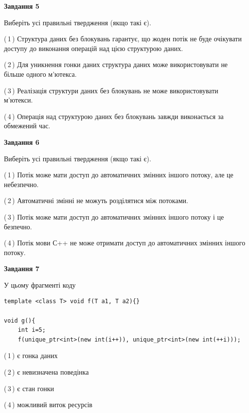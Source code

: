 \documentclass[12pt, ukrainian]{article}
\begin{document}
\begin {large}
{\begin{center}
\textbf{Завдання 5}
\end{center}

Виберіть усі правильні твердження (якщо такі є).\par
\vspace{2mm}

(\,1\,) Структура даних без блокувань гарантує, що жоден потік не буде очікувати доступу до виконання операцій над цією структурою даних.%

(\,2\,) Для уникнення гонки даних структура даних може використовувати не більше одного м’ютекса.%

(\,3\,) Реалізація структури даних без блокувань не може використовувати м’ютекси.%

(\,4\,) Операція над структурою даних без блокувань завжди виконається за обмежений час.%
\newpage


\begin{center}
\textbf{Завдання 6}
\end{center}

Виберіть усі правильні твердження (якщо такі є).\par
\vspace{2mm}

(\,1\,) Потік може мати доступ до автоматичних змінних іншого потоку, але це небезпечно.%

(\,2\,) Автоматичні змінні не можуть розділятися між потоками.%

(\,3\,) Потік може мати доступ до автоматичних змінних іншого потоку і це безпечно.%

(\,4\,) Потік мови С++ не може отримати доступ до автоматичних змінних іншого потоку.%


\begin{center}
\textbf{Завдання 7}
\end{center}

У цьому фрагменті коду
\begin{verbatim}
template <class T> void f(T a1, T a2){}

void g(){
    int i=5;
    f(unique_ptr<int>(new int(i++)), unique_ptr<int>(new int(++i)));
\end{verbatim}

(\,1\,) є гонка даних%

(\,2\,) є невизначена поведінка%

(\,3\,) є стан гонки%

(\,4\,) можливий виток ресурсів%

}
\end {large}

\vspace{4mm}
\newpage
\end{document}
